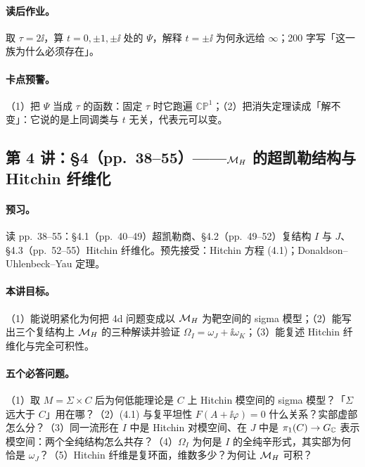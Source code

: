 {\paragraph{读后作业。}取 \(\tau=2\ii\)，算 \(t=0,\pm1,\pm\ii\) 处的 \(\Psi\)，解释 \(t=\pm\ii\) 为何永远给 \(\infty\)；200 字写「这一族为什么必须存在」。\pC

\paragraph{卡点预警。}（1）把 \(\Psi\) 当成 \(\tau\) 的函数：固定 \(\tau\) 时它跑遍 \(\mathbb{CP}^1\)；（2）把消失定理读成「解不变」：它说的是上同调类与 \(t\) 无关，代表元可以变。\pC

\subsection{第 4 讲：\S4（pp.~38--55）——\texorpdfstring{\(\mathcal{M}_H\)}{MH} 的超凯勒结构与 Hitchin 纤维化}

\paragraph{预习。}读 pp.~38--55：§4.1（pp.~40--49）超凯勒商、§4.2（pp.~49--52）复结构 \(I\) 与 \(J\)、§4.3（pp.~52--55）Hitchin 纤维化。预先接受：Hitchin 方程 (4.1)；Donaldson--Uhlenbeck--Yau 定理。\pC

\paragraph{本讲目标。}（1）能说明紧化为何把 4d 问题变成以 \(\mathcal{M}_H\) 为靶空间的 sigma 模型；（2）能写出三个复结构上 \(\mathcal{M}_H\) 的三种解读并验证 \(\Omega_I=\omega_J+\ii\omega_K\)；（3）能复述 Hitchin 纤维化与完全可积性。\pC

\paragraph{五个必答问题。}（1）取 \(M=\Sigma\times C\) 后为何低能理论是 \(C\) 上 Hitchin 模空间的 sigma 模型？「\(\Sigma\) 远大于 \(C\)」用在哪？（2）(4.1) 与复平坦性 \(F(A+\ii\varphi)=0\) 什么关系？实部虚部怎么分？（3）同一流形在 \(I\) 中是 Hitchin 对模空间、在 \(J\) 中是 \(\pi_1(C)\to G_{\mathbb{C}}\) 表示模空间：两个全纯结构怎么共存？（4）\(\Omega_I\) 为何是 \(I\) 的全纯辛形式，其实部为何恰是 \(\omega_J\)？（5）Hitchin 纤维是复环面，维数多少？为何让 \(\mathcal{M}_H\) 可积？\pC

}
